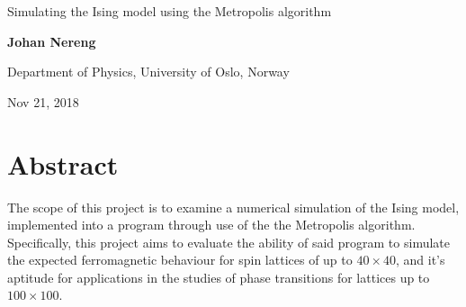 \documentclass[%
oneside,                 %
final,                   %
10pt]{article}
\begin{document}

\newcommand{\exercisesection}[1]{\subsection*{#1}}






\thispagestyle{empty}

\begin{center}
{\LARGE\bf
\begin{spacing}{1.25}
Simulating the Ising model using the Metropolis algorithm
\end{spacing}
}
\end{center}


\begin{center}
{\bf Johan Nereng}
\end{center}

    \begin{center}
\centerline{{\small Department of Physics, University of Oslo, Norway}}
\end{center}
    

\begin{center}
Nov 21, 2018
\end{center}

\vspace{1cm}

\section{Abstract}
The scope of this project is to examine a numerical simulation of the Ising model, implemented into a program through use of the the Metropolis algorithm. Specifically, this project aims to evaluate the ability of said program to simulate the expected ferromagnetic behaviour for spin lattices of up to $40 \times 40$, and it's aptitude for applications in the studies of phase transitions for lattices up to $100 \times 100$. \newline
\end{document}
